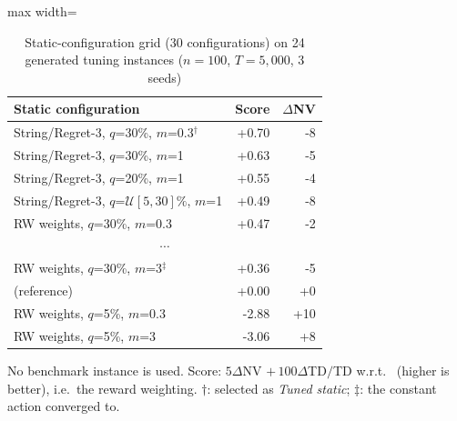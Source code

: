 \begin{table}[t]
\centering
\caption{Static-configuration grid (30 configurations) on 24 generated tuning instances ($n=100$, $T=5{,}000$, 3 seeds)}\label{tab:static}
\setlength{\tabcolsep}{4pt}
\begin{adjustbox}{max width=\linewidth}
\begin{tabular}{lrr}
\toprule
Static configuration & Score & $\Delta$NV \\ \midrule
String/Regret-3, $q$=30\%, $m$=0.3$^\dagger$ & +0.70 & -8\\
String/Regret-3, $q$=30\%, $m$=1 & +0.63 & -5\\
String/Regret-3, $q$=20\%, $m$=1 & +0.55 & -4\\
String/Regret-3, $q$=$\mathcal U[5,30]\%$, $m$=1 & +0.49 & -8\\
RW weights, $q$=30\%, $m$=0.3 & +0.47 & -2\\
\multicolumn{3}{c}{$\cdots$}\\
RW weights, $q$=30\%, $m$=3$^\ddagger$ & +0.36 & -5\\
\Rw{} (reference) & +0.00 & +0\\
RW weights, $q$=5\%, $m$=0.3 & -2.88 & +10\\
RW weights, $q$=5\%, $m$=3 & -3.06 & +8\\
\bottomrule
\end{tabular}
\end{adjustbox}
\par\vspace{2pt}\parbox{\linewidth}{\footnotesize No benchmark instance is used. Score: $5\Delta$NV $+\,100\Delta$TD$/$TD w.r.t.\ \Rw{} (higher is better), i.e.\ the reward weighting. $\dagger$: selected as \emph{Tuned static}; $\ddagger$: the constant action \sgalns{} converged to.}
\end{table}
